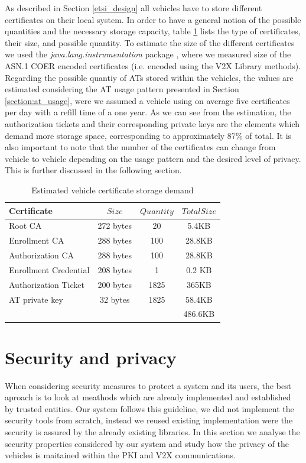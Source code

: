 As described in Section \ref{etsi_design} all vehicles have to store different certificates on their local system. In order to have a general notion of the possible quantities and the necessary storage capacity, table \ref{tab:table3} lists the type of certificates, their size, and possible quantity. To estimate the size of the different certificates we used the \textit{java.lang.instrumentation} package \cite{instrumentation}, where we measured size of the ASN.1 COER encoded certificates (i.e. encoded using the V2X Library methods). Regarding the possible quantiy of ATs stored within the vehicles, the values are estimated considering the AT usage pattern presented in Section \ref{section:at_usage}, were we assumed a vehicle using on average five certificates per day with a refill time of a one year. As we can see from the estimation, the authorization tickets and their corresponding private keys are the elements which demand more storage space, corresponding to approximately 87\% of total. It is also important to note that the number of the certificates can change from vehicle to vehicle depending on the usage pattern and the desired level of privacy. This is further discussed in the following section.

\begin{table}[!htb]
	\renewcommand{\arraystretch}{1.2} %
	\centering
	\begin{tabular}{lccc}
		\toprule
		Certificate & $Size$ & $Quantity$& $TotalSize$ \\
		\midrule
		Root CA         & 272 bytes & 20 &5.4KB \\
		Enrollment CA  & 288 bytes &100&28.8KB \\
		Authorization CA  & 288 bytes&100&28.8KB\\
		Enrollment Credential  & 208 bytes &1 & 0.2 KB\\
		Authorization Ticket  & 200 bytes &1825 & 365KB\\
		AT private key & 32 bytes & 1825 & 58.4KB\\
		\midrule
		\null  & \null & \null & 486.6KB\\
		\bottomrule
		\end{tabular}
		
		\caption[time]{Estimated vehicle certificate storage demand}
		\label{tab:table3}
	\end{table} 


\section{Security and privacy}
\label{section:pricacy}
When considering security measures to protect a system and its users, the best aproach is to look at meathods which are already implemented and established by trusted entities. 
Our system follows this guideline, we did not implement the security tools from scratch, instead we reused existing implementation were the security is assured by the already existing libraries.
In this section we analyse the security properties considered by our system and study how the privacy of the vehicles is maitained within the PKI and V2X communications.

